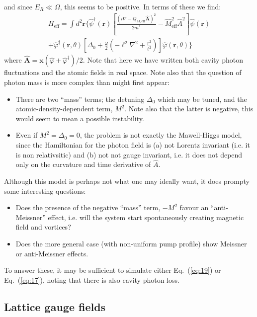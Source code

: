 \documentclass[twocolumn]{revtex4-1}
\renewcommand{\vec}[1]{\mathbf{#1}}
\newcommand{\lho}{\ell}
\begin{document}
and since $E_R \ll \Omega$, this seems to be positive. In terms of these we find:
\begin{multline}
  \label{eq:19}
  H_{\text{eff}} 
  =
  \int d^2\vec{r} \Biggl\{
  \hat{\psi}^\dagger(\vec{r})
  \left[
  \frac{  \left(i \nabla - 
      {Q}_{M,\text{eff}}  \hat{\vec{A}}
  \right)^2}{2m^\ast}
- \hat{M}_\text{eff}^2 \hat{A}^2
  \right]
  \hat{\psi}^{}(\vec{r})
  \\
  +
  \hat{\varphi}^\dagger(\vec{r},\theta)
  \left[
    \Delta_0  
    + \frac{\omega}{2}\left(
    - {\lho^2} \nabla^2
    + \frac{r^2}{\lho^2} \right)
    \right]
  \hat{\varphi}(\vec{r},\theta)
  \Biggr\}
\end{multline}
where $\hat{\vec{A}} = \vec{x} (\hat{\varphi}+
\hat{\varphi}^\dagger)/2$.  Note that here we have written both
cavity photon fluctuations and the atomic fields in real space.  Note
also that the question of photon mass is more complex than might first
appear:
\begin{itemize}
\item There are two ``mass'' terms; the detuning $\Delta_0$ which may
  be tuned, and the atomic-density-dependent term, $M^2$.  Note also
  that the latter is negative, this would seem to mean a possible
  instability.
\item Even if $M^2=\Delta_0=0$, the problem is not exactly the
  Mawell-Higgs model, since the Hamiltonian for the photon field is
  (a) not Lorentz invariant (i.e. it is non relativsitic) and (b) not
  not gauge invariant, i.e. it does not depend only on
  the curvature and time derivative of $\hat A$.
\end{itemize}
Although this model is perhaps not what one may ideally want, it does
prompty some interesting questions:
\begin{itemize}
\item Does the presence of the negative ``mass'' term, $-M^2$ 
  favour an ``anti-Meissner'' effect, i.e. will the system
  start spontaneously creating magnetic field and vortices?
\item Does the more general case (with non-uniform pump profile)
  show Meissner or anti-Meissner effects.
\end{itemize}
To answer these, it may be sufficient to simulate either
Eq.~(\ref{eq:19}) or Eq.~(\ref{eq:17}), noting that there is also
cavity photon loss.

\subsection{Lattice gauge fields}
\label{sec:lattice-gauge-fields}
\end{document}
